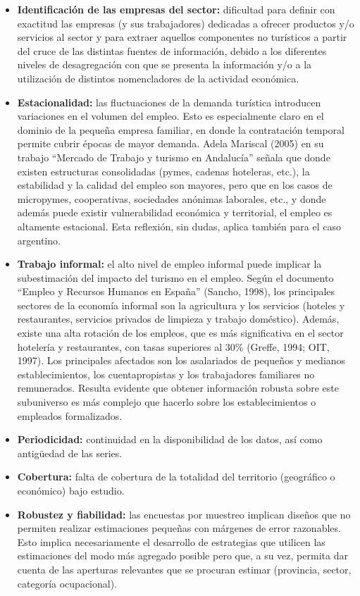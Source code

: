 \documentclass[
  openany]{book}
\providecommand{\tightlist}{%
  \setlength{\itemsep}{0pt}\setlength{\parskip}{0pt}}
\begin{document}
\begin{itemize}
\tightlist
\item
  \textbf{Identificación de las empresas del sector:} dificultad para definir con exactitud las empresas (y sus trabajadores) dedicadas a ofrecer productos y/o servicios al sector y para extraer aquellos componentes no turísticos a partir del cruce de las distintas fuentes de información, debido a los diferentes niveles de desagregación con que se presenta la información y/o a la utilización de distintos nomencladores de la actividad económica.
\item
  \textbf{Estacionalidad:} las fluctuaciones de la demanda turística introducen variaciones en el volumen del empleo. Esto es especialmente claro en el dominio de la pequeña empresa familiar, en donde la contratación temporal permite cubrir épocas de mayor demanda. Adela Mariscal (2005) en su trabajo ``Mercado de Trabajo y turismo en Andalucía'' señala que donde existen estructuras consolidadas (pymes, cadenas hoteleras, etc.), la estabilidad y la calidad del empleo son mayores, pero que en los casos de micropymes, cooperativas, sociedades anónimas laborales, etc., y donde además puede existir vulnerabilidad económica y territorial, el empleo es altamente estacional. Esta reflexión, sin dudas, aplica también para el caso argentino.
\item
  \textbf{Trabajo informal:} el alto nivel de empleo informal puede implicar la subestimación del impacto del turismo en el empleo. Según el documento ``Empleo y Recursos Humanos en España'' (Sancho, 1998), los principales sectores de la economía informal son la agricultura y los servicios (hoteles y restaurantes, servicios privados de limpieza y trabajo doméstico). Además, existe una alta rotación de los empleos, que es más significativa en el sector hotelería y restaurantes, con tasas superiores al 30\% (Greffe, 1994; OIT, 1997). Los principales afectados son los asalariados de pequeños y medianos establecimientos, los cuentapropistas y los trabajadores familiares no remunerados. Resulta evidente que obtener información robusta sobre este subuniverso es más complejo que hacerlo sobre los establecimientos o empleados formalizados.
\item
  \textbf{Periodicidad:} continuidad en la disponibilidad de los datos, así como antigüedad de las series.
\item
  \textbf{Cobertura:} falta de cobertura de la totalidad del territorio (geográfico o económico) bajo estudio.
\item
  \textbf{Robustez y fiabilidad:} las encuestas por muestreo implican diseños que no permiten realizar estimaciones pequeñas con márgenes de error razonables. Esto implica necesariamente el desarrollo de estrategias que utilicen las estimaciones del modo más agregado posible pero que, a su vez, permita dar cuenta de las aperturas relevantes que se procuran estimar (provincia, sector, categoría ocupacional).
\end{itemize}
\end{document}
